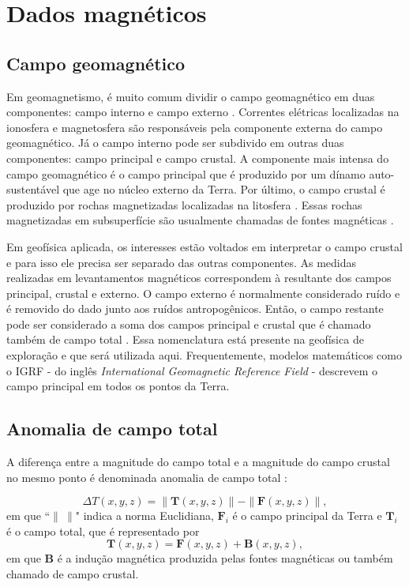 \chapter{Dados magnéticos}

\section{Campo geomagnético}

Em geomagnetismo, é muito comum dividir o campo geomagnético em duas componentes: campo interno e campo externo \citep{treatise2007}. Correntes elétricas localizadas na ionosfera e magnetosfera são responsáveis pela componente externa do campo geomagnético. Já o campo interno pode ser subdivido em outras duas componentes: campo principal e campo crustal. A componente mais intensa do campo geomagnético é o campo principal que é produzido por um dínamo auto-sustentável que age no núcleo externo da Terra. Por último, o campo crustal é produzido por rochas magnetizadas localizadas na litosfera \citep{langel-hinze1998, treatise2007}. Essas rochas magnetizadas em subsuperfície são usualmente chamadas de fontes magnéticas \citep{blakely1996, nabighian-etal2005-mag}.

Em geofísica aplicada, os interesses estão voltados em interpretar o campo crustal e para isso ele precisa ser separado das outras componentes. As medidas realizadas em levantamentos magnéticos correspondem à resultante dos campos principal, crustal e externo. O campo externo é normalmente considerado ruído e é removido do dado junto aos ruídos antropogênicos. Então, o campo restante pode ser considerado a soma dos campos principal e crustal \citep{treatise2007} que é chamado também de campo total \citep{blakely1996}. Essa nomenclatura está presente na geofísica de exploração e que será utilizada aqui. Frequentemente, modelos matemáticos como o IGRF - do inglês \textit{International Geomagnetic Reference Field} - descrevem o campo principal em todos os pontos da Terra.

\section{Anomalia de campo total}

A diferença entre a magnitude do campo total e a magnitude do campo crustal no mesmo ponto é denominada anomalia de campo total \citep{blakely1996, nabighian-etal2005-mag}:

\begin{equation}\label{eq:anomtotal}
\Delta T(x, y, z) = \|\mathbf{T}(x, y, z)\| - \| \mathbf{F}(x, y, z)\|,
\end{equation}
em que ``$\| \: \|$" indica a norma Euclidiana, $\mathbf{F}_i$ é o campo principal da Terra e $\mathbf{T}_i$ é o campo total, que é representado por
\begin{equation}\label{eq:camptotal}
\mathbf{T}(x, y, z) = \mathbf{F}(x, y, z) + \mathbf{B}(x, y, z) ,
\end{equation}
em que $\mathbf{B}$ é a indução magnética produzida pelas fontes magnéticas ou também chamado de campo crustal.

